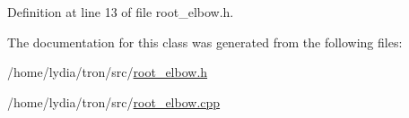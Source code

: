 Definition at line 13 of file root\+\_\+elbow.\+h.



The documentation for this class was generated from the following files\+:\begin{DoxyCompactItemize}
\item 
/home/lydia/tron/src/\hyperlink{root__elbow_8h}{root\+\_\+elbow.\+h}\item 
/home/lydia/tron/src/\hyperlink{root__elbow_8cpp}{root\+\_\+elbow.\+cpp}\end{DoxyCompactItemize}
